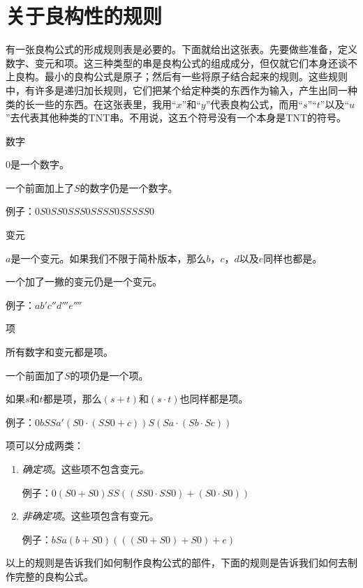 \section{关于良构性的规则}

有一张良构公式的形成规则表是必要的。下面就给出这张表。先要做些准备，定义数字、变元和项。这三种类型的串是良构公式的组成成分，但仅就它们本身还谈不上良构。最小的良构公式是原子；然后有一些将原子结合起来的规则。这些规则中，有许多是递归加长规则，它们把某个给定种类的东西作为输入，产生出同一种类的长一些的东西。在这张表里，我用“$x$”和“$y$”代表良构公式，而用“$s$”“$t$”以及“$u$”去代表其他种类的TNT串。不用说，这五个符号没有一个本身是TNT的符号。

\begin{rulelist}
\item[数字]\indent

$0$是一个数字。

一个前面加上了$S$的数字仍是一个数字。

例子：$0$\quad$S0$\quad$SS0$\quad$SSS0$\quad$SSSS0$\quad$SSSSS0$

\item[变元]\indent

$a$是一个变元。如果我们不限于简朴版本，那么$b$，$c$，$d$以及$e$同样也都是。

一个加了一撇的变元仍是一个变元。

例子：$a$\quad$b'$\quad$c''$\quad$d'''$\quad$e''''$

\item[项]\indent

所有数字和变元都是项。

一个前面加了$S$的项仍是一个项。

如果$s$和$t$都是项，那么$(s+t)$和$(s\cdot t)$也同样都是项。

例子：$0$\quad$b$\quad$SSa'$\quad$(S0\cdot(SS0+c))$\quad$S(Sa\cdot(Sb\cdot Sc))$

项可以分成两类：
\begin{enumerate}[labelindent=0pt]
\item \emph{确定项}。这些项不包含变元。

例子：$0$\quad$(S0+S0)$\quad$SS((SS0\cdot SS0)+(S0\cdot S0))$

\item \emph{非确定项}。这些项包含有变元。

例子：$b$\quad$Sa$\quad$(b+S0)$\quad$(((S0+S0)+S0)+e)$
\end{enumerate}
\end{rulelist}
以上的规则是告诉我们如何制作良构公式的部件，下面的规则是告诉我们如何去制作完整的良构公式。
